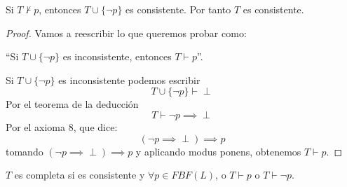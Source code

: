 \begin{theorem}
	Si $T \nvdash p$, entonces $T\cup \{\neg p\}$ es consistente. Por tanto $T$ es consistente.
	\label{thm:pconsnegp}
\end{theorem}
\begin{proof}

	Vamos a reescribir lo que queremos probar como:
	\begin{center}``Si $T\cup \{\neg p\}$ es inconsistente, entonces $T\vdash p$''.\end{center}

	Si $T\cup \{\neg p\}$ es inconsistente podemos escribir
	\[T\cup \{\neg p\}\vdash \perp\]
	Por el teorema de la deducción
	\[T\vdash \neg p\implies \perp\]
	Por el axioma 8, que dice:
	\[(\neg p\implies \perp)\implies p\]
	tomando $(\neg p \implies \perp)\implies p$ y aplicando modus ponens, obtenemos $T\vdash p$.
\end{proof}

\begin{defn}
	$T$ es completa si es consistente y $\forall p\in FBF(L)$, o $T\vdash p$ o $T\vdash \neg p$.
\end{defn}

